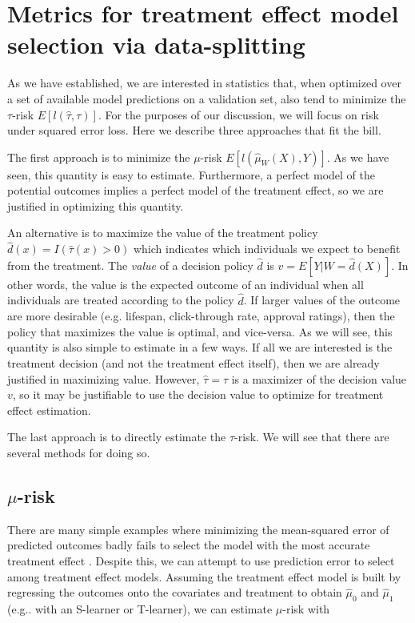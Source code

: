 \section{Metrics for treatment effect model selection via data-splitting}
\label{approaches}

As we have established, we are interested in statistics that, when optimized over a set of available model predictions on a validation set, also tend to minimize the $\tau$-risk $E[l(\hat\tau, \tau)]$. For the purposes of our discussion, we will focus on risk under squared error loss. Here we describe three approaches that fit the bill.

The first approach is to minimize the $\mu$-risk $E[l(\hat\mu_{W}(X), Y)]$. As we have seen, this quantity is easy to estimate. Furthermore, a perfect model of the potential outcomes implies a perfect model of the treatment effect, so we are justified in optimizing this quantity.

An alternative is to maximize the value of the treatment policy $\hat d(x) = I(\hat\tau(x) > 0)$ which indicates which individuals we expect to benefit from the treatment. The \emph{value} of a decision policy $\hat d$ is $v = E[Y|W=\hat d(X)]$. In other words, the value is the expected outcome of an individual when all individuals are treated according to the policy $\hat d$. If larger values of the outcome are more desirable (e.g. lifespan, click-through rate, approval ratings), then the policy that maximizes the value is optimal, and vice-versa. As we will see, this quantity is also simple to estimate in a few ways. If all we are interested is the treatment decision (and not the treatment effect itself), then we are already justified in maximizing value. However, $\hat\tau = \tau$ is a maximizer of the decision value $v$, so it may be justifiable to use the decision value to optimize for treatment effect estimation.

The last approach is to directly estimate the $\tau$-risk. We will see that there are several methods for doing so.

\subsection{$\mu$-risk}
\label{sec:pred-error}

There are many simple examples where minimizing the mean-squared error of predicted outcomes badly fails to select the model with the most accurate treatment effect \cite{Rolling:2013kz}. Despite this, we can attempt to use prediction error to select among treatment effect models. Assuming the treatment effect model is built by regressing the outcomes onto the covariates and treatment to obtain $\hat\mu_0$ and $\hat\mu_1$ (e.g.. with an S-learner or T-learner), we can estimate $\mu$-risk with

